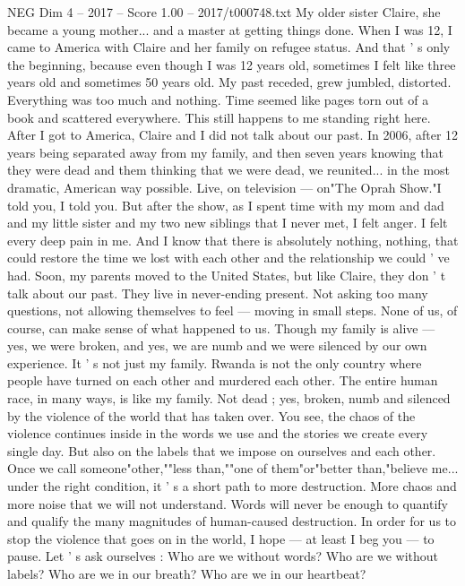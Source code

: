 \begin{textsample}{NEG Dim 4 – 2017 – Score 1.00 – 2017/t000748.txt}
My older sister Claire, she became a young mother... and a master at getting things done.
When I was 12, I came to America with Claire and her family on refugee status.
And that ' s only the beginning, because even though I was 12 years old, sometimes I felt like three years old and sometimes 50 years old.
My past receded, grew jumbled, distorted.
Everything was too much and nothing.
Time seemed like pages torn out of a book and scattered everywhere.
This still happens to me standing right here.
After I got to America, Claire and I did not talk about our past.
In 2006, after 12 years being separated away from my family, and then seven years knowing that they were dead and them thinking that we were dead, we reunited... in the most dramatic, American way possible.
Live, on television — on"The Oprah Show."I told you, I told you.
But after the show, as I spent time with my mom and dad and my little sister and my two new siblings that I never met, I felt anger.
I felt every deep pain in me.
And I know that there is absolutely nothing, nothing, that could restore the time we lost with each other and the relationship we could ' ve had.
Soon, my parents moved to the United States, but like Claire, they don ' t talk about our past.
They live in never-ending present.
Not asking too many questions, not allowing themselves to feel — moving in small steps.
None of us, of course, can make sense of what happened to us.
Though my family is alive — yes, we were broken, and yes, we are numb and we were silenced by our own experience.
It ' s not just my family.
Rwanda is not the only country where people have turned on each other and murdered each other.
The entire human race, in many ways, is like my family.
Not dead ; yes, broken, numb and silenced by the violence of the world that has taken over.
You see, the chaos of the violence continues inside in the words we use and the stories we create every single day.
But also on the labels that we impose on ourselves and each other.
Once we call someone"other,""less than,""one of them"or"better than,"believe me... under the right condition, it ' s a short path to more destruction.
More chaos and more noise that we will not understand.
Words will never be enough to quantify and qualify the many magnitudes of human-caused destruction.
In order for us to stop the violence that goes on in the world, I hope — at least I beg you — to pause.
Let ' s ask ourselves : Who are we without words?
Who are we without labels?
Who are we in our breath?
Who are we in our heartbeat?

\end{textsample}
